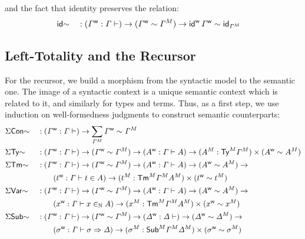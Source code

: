   and the fact that identity preserves the relation:
  \begin{alignat*}{5}
     & {\id}{\sim} && :
    (\wf{\GG} : \GG \vdash ) \ra
  (\wf{\GG} \sim \model{\GG}) \ra
   \wf{{\id}}\,\wf{\GG} \sim {\id}_{\model{\GG}}
  \end{alignat*}

\subsection{Left-Totality and the Recursor}
For the recursor, we build a morphism from the syntactic model to the semantic
one. The image of a syntactic context is a unique semantic context which is
related to it, and similarly for types and terms.
Thus, as a first step, we use induction on well-formedness judgments to construct
semantic counterparts:
  \begin{alignat*}{5}
     & \Sigma\Con{\sim} && :
    (\wf{\GG} : \GG \vdash ) \ra
    \sum_{\model{\GG}} \wf{\GG} \sim \model{\GG}
    \\
     & \Sigma\Ty{\sim} && :
    (\wf{\GG} : \GG \vdash ) \ra
    (\wf{\GG}\sim \model\GG) \ra
    (\wf{A} : \GG \vdash A ) \ra
    ({\model{A}:\model{\Ty}\model\GG})\times ( \wf{A} \sim \model{A})
    \\
     & \Sigma\Tm{\sim} && :
    (\wf{\GG} : \GG \vdash ) \ra
    (\wf{\GG}\sim \model\GG) \ra
    (\wf{A} : \GG \vdash A ) \ra
    ( \wf{A} \sim \model{A}) \ra
    \\ & && \qquad
    (\wf{t} : \GG \vdash t \in A ) \ra
    ({\model{t}:\model{\Tm}\model\GG}\model{A})\times ( \wf{t} \sim \model{t})
    \\
     & \Sigma\Var{\sim} && :
    (\wf{\GG} : \GG \vdash ) \ra
    (\wf{\GG}\sim \model\GG) \ra
    (\wf{A} : \GG \vdash A ) \ra
    ( \wf{A} \sim \model{A}) \ra
    \\ & && \qquad
    (\wf{x} : \GG \vdash x \invar A ) \ra
    ({\model{x}:\model{\Tm}\model\GG}\model{A})\times ( \wf{x} \sim \model{x})
    \\
     & \Sigma\Sub{\sim} && :
    (\wf{\GG} : \GG \vdash ) \ra
    (\wf{\GG}\sim \model\GG) \ra
    (\wf{\GD} : \GD \vdash  ) \ra
    ( \wf{\GD} \sim \model{\GD}) \ra
    \\ & && \qquad
    (\wf{\sigma} : \GG \vdash \sigma \Rightarrow \GD ) \ra
    ({\model{\sigma}:\model{\Sub}\model\GG}\model{\GD})\times ( \wf{\sigma} \sim \model{\sigma})
  \end{alignat*}
